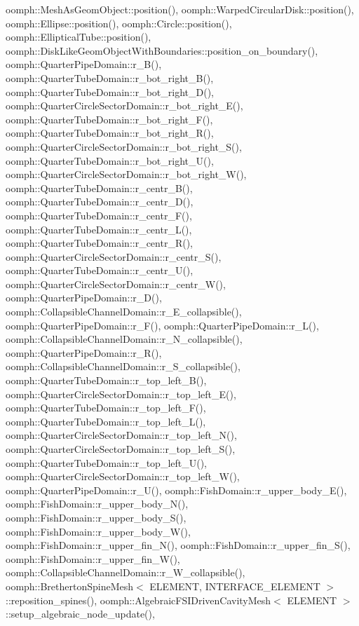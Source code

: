 oomph\+::\+Mesh\+As\+Geom\+Object\+::position(), oomph\+::\+Warped\+Circular\+Disk\+::position(), oomph\+::\+Ellipse\+::position(), oomph\+::\+Circle\+::position(), oomph\+::\+Elliptical\+Tube\+::position(), oomph\+::\+Disk\+Like\+Geom\+Object\+With\+Boundaries\+::position\+\_\+on\+\_\+boundary(), oomph\+::\+Quarter\+Pipe\+Domain\+::r\+\_\+\+B(), oomph\+::\+Quarter\+Tube\+Domain\+::r\+\_\+bot\+\_\+right\+\_\+\+B(), oomph\+::\+Quarter\+Tube\+Domain\+::r\+\_\+bot\+\_\+right\+\_\+\+D(), oomph\+::\+Quarter\+Circle\+Sector\+Domain\+::r\+\_\+bot\+\_\+right\+\_\+\+E(), oomph\+::\+Quarter\+Tube\+Domain\+::r\+\_\+bot\+\_\+right\+\_\+\+F(), oomph\+::\+Quarter\+Tube\+Domain\+::r\+\_\+bot\+\_\+right\+\_\+\+R(), oomph\+::\+Quarter\+Circle\+Sector\+Domain\+::r\+\_\+bot\+\_\+right\+\_\+\+S(), oomph\+::\+Quarter\+Tube\+Domain\+::r\+\_\+bot\+\_\+right\+\_\+\+U(), oomph\+::\+Quarter\+Circle\+Sector\+Domain\+::r\+\_\+bot\+\_\+right\+\_\+\+W(), oomph\+::\+Quarter\+Tube\+Domain\+::r\+\_\+centr\+\_\+\+B(), oomph\+::\+Quarter\+Tube\+Domain\+::r\+\_\+centr\+\_\+\+D(), oomph\+::\+Quarter\+Tube\+Domain\+::r\+\_\+centr\+\_\+\+F(), oomph\+::\+Quarter\+Tube\+Domain\+::r\+\_\+centr\+\_\+\+L(), oomph\+::\+Quarter\+Tube\+Domain\+::r\+\_\+centr\+\_\+\+R(), oomph\+::\+Quarter\+Circle\+Sector\+Domain\+::r\+\_\+centr\+\_\+\+S(), oomph\+::\+Quarter\+Tube\+Domain\+::r\+\_\+centr\+\_\+\+U(), oomph\+::\+Quarter\+Circle\+Sector\+Domain\+::r\+\_\+centr\+\_\+\+W(), oomph\+::\+Quarter\+Pipe\+Domain\+::r\+\_\+\+D(), oomph\+::\+Collapsible\+Channel\+Domain\+::r\+\_\+\+E\+\_\+collapsible(), oomph\+::\+Quarter\+Pipe\+Domain\+::r\+\_\+\+F(), oomph\+::\+Quarter\+Pipe\+Domain\+::r\+\_\+\+L(), oomph\+::\+Collapsible\+Channel\+Domain\+::r\+\_\+\+N\+\_\+collapsible(), oomph\+::\+Quarter\+Pipe\+Domain\+::r\+\_\+\+R(), oomph\+::\+Collapsible\+Channel\+Domain\+::r\+\_\+\+S\+\_\+collapsible(), oomph\+::\+Quarter\+Tube\+Domain\+::r\+\_\+top\+\_\+left\+\_\+\+B(), oomph\+::\+Quarter\+Circle\+Sector\+Domain\+::r\+\_\+top\+\_\+left\+\_\+\+E(), oomph\+::\+Quarter\+Tube\+Domain\+::r\+\_\+top\+\_\+left\+\_\+\+F(), oomph\+::\+Quarter\+Tube\+Domain\+::r\+\_\+top\+\_\+left\+\_\+\+L(), oomph\+::\+Quarter\+Circle\+Sector\+Domain\+::r\+\_\+top\+\_\+left\+\_\+\+N(), oomph\+::\+Quarter\+Circle\+Sector\+Domain\+::r\+\_\+top\+\_\+left\+\_\+\+S(), oomph\+::\+Quarter\+Tube\+Domain\+::r\+\_\+top\+\_\+left\+\_\+\+U(), oomph\+::\+Quarter\+Circle\+Sector\+Domain\+::r\+\_\+top\+\_\+left\+\_\+\+W(), oomph\+::\+Quarter\+Pipe\+Domain\+::r\+\_\+\+U(), oomph\+::\+Fish\+Domain\+::r\+\_\+upper\+\_\+body\+\_\+\+E(), oomph\+::\+Fish\+Domain\+::r\+\_\+upper\+\_\+body\+\_\+\+N(), oomph\+::\+Fish\+Domain\+::r\+\_\+upper\+\_\+body\+\_\+\+S(), oomph\+::\+Fish\+Domain\+::r\+\_\+upper\+\_\+body\+\_\+\+W(), oomph\+::\+Fish\+Domain\+::r\+\_\+upper\+\_\+fin\+\_\+\+N(), oomph\+::\+Fish\+Domain\+::r\+\_\+upper\+\_\+fin\+\_\+\+S(), oomph\+::\+Fish\+Domain\+::r\+\_\+upper\+\_\+fin\+\_\+\+W(), oomph\+::\+Collapsible\+Channel\+Domain\+::r\+\_\+\+W\+\_\+collapsible(), oomph\+::\+Bretherton\+Spine\+Mesh$<$ E\+L\+E\+M\+E\+N\+T, I\+N\+T\+E\+R\+F\+A\+C\+E\+\_\+\+E\+L\+E\+M\+E\+N\+T $>$\+::reposition\+\_\+spines(), oomph\+::\+Algebraic\+F\+S\+I\+Driven\+Cavity\+Mesh$<$ E\+L\+E\+M\+E\+N\+T $>$\+::setup\+\_\+algebraic\+\_\+node\+\_\+update(), 